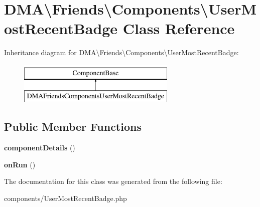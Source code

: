 \hypertarget{classDMA_1_1Friends_1_1Components_1_1UserMostRecentBadge}{\section{D\-M\-A\textbackslash{}Friends\textbackslash{}Components\textbackslash{}User\-Most\-Recent\-Badge Class Reference}
\label{classDMA_1_1Friends_1_1Components_1_1UserMostRecentBadge}
}
Inheritance diagram for D\-M\-A\textbackslash{}Friends\textbackslash{}Components\textbackslash{}User\-Most\-Recent\-Badge\-:\begin{figure}[H]
\begin{center}
\leavevmode
\includegraphics[height=2.000000cm]{d7/d5f/classDMA_1_1Friends_1_1Components_1_1UserMostRecentBadge}
\end{center}
\end{figure}
\subsection*{Public Member Functions}
\begin{DoxyCompactItemize}
\item 
\hypertarget{classDMA_1_1Friends_1_1Components_1_1UserMostRecentBadge_af1a08876aa0dd5462363a71e4624e085}{{\bfseries component\-Details} ()}\label{classDMA_1_1Friends_1_1Components_1_1UserMostRecentBadge_af1a08876aa0dd5462363a71e4624e085}

\item 
\hypertarget{classDMA_1_1Friends_1_1Components_1_1UserMostRecentBadge_a8344e51d141173d907bf02bddec92635}{{\bfseries on\-Run} ()}\label{classDMA_1_1Friends_1_1Components_1_1UserMostRecentBadge_a8344e51d141173d907bf02bddec92635}

\end{DoxyCompactItemize}


The documentation for this class was generated from the following file\-:\begin{DoxyCompactItemize}
\item 
components/User\-Most\-Recent\-Badge.\-php\end{DoxyCompactItemize}
